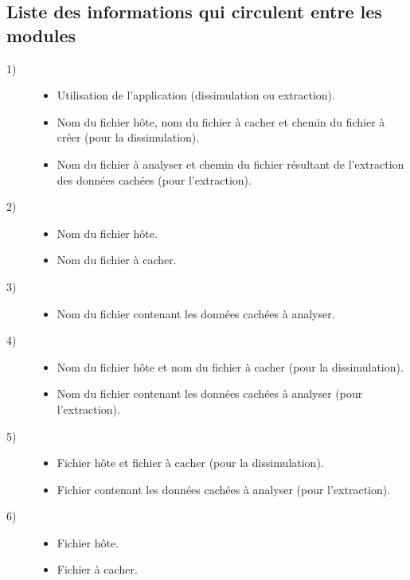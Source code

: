 \documentclass[11pt]{article}
\begin{document}
\subsection{Liste des informations qui circulent entre les modules}

\begin{multicols}{2}
\begin{description}
\item[1)] 
\begin{itemize}
\item Utilisation de l'application (dissimulation ou extraction).
\item Nom du fichier hôte, nom du fichier à cacher et chemin du fichier à créer
    (pour la dissimulation).
\item Nom du fichier à analyser et chemin du fichier résultant de l'extraction
    des données cachées (pour l'extraction).
\end{itemize}
\item[2)] 
\begin{itemize}
\item Nom du fichier hôte.
\item Nom du fichier à cacher.
\end{itemize}
\item[3)] 
\begin{itemize}
\item Nom du fichier contenant les données cachées à analyser.
\end{itemize}
\item[4)] 
\begin{itemize}
\item Nom du fichier hôte et nom du fichier à cacher (pour la dissimulation).
\item Nom du fichier contenant les données cachées à analyser (pour
    l'extraction).
\end{itemize}
\item[5)]
\begin{itemize}
\item Fichier hôte et fichier à cacher (pour la dissimulation).
\item Fichier contenant les données cachées à analyser (pour l'extraction).
\end{itemize}
\item[6)]
\begin{itemize}
\item Fichier hôte.
\item Fichier à cacher.
\end{itemize}

\end{description}
\end{multicols}
\end{document}
